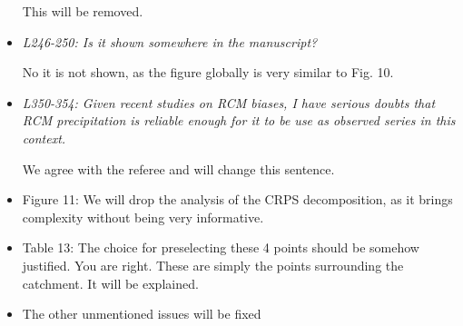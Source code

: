 \documentclass[]{letter}
\begin{document}
\begin{itemize}
	This will be removed.
	
	\item \textit{L246-250: Is it shown somewhere in the manuscript?}
	
	No it is not shown, as the figure globally is very similar to Fig. 10.
	
	\item \textit{L350-354: Given recent studies on RCM biases, I have serious doubts that RCM precipitation is reliable enough for it to be use as observed series in this context.}
	
	We agree with the referee and will change this sentence.
	
	\item Figure 11: We will drop the analysis of the CRPS decomposition, as it brings complexity without being very informative.
	
	\item Table 13: The choice for preselecting these 4 points should be somehow justified.
	You are right. These are simply the points surrounding the catchment. It will be explained.
	
	\item The other unmentioned issues will be fixed
	
	
\end{itemize}
\end{document}
